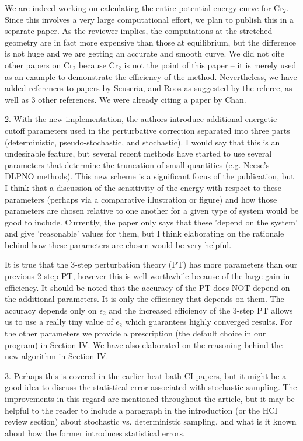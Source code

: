 \documentclass[
preprint,
onecolumn,
 superscriptaddress,
 amsmath,amssymb,
 aps,
]{revtex4-1}
\begin{document}
We are indeed working on calculating the entire potential energy curve for Cr$_2$.  Since this
involves a very large computational effort,
we plan to publish this in a separate paper.  As the reviewer implies, the computations at the
stretched geometry are in fact
more expensive than those at equilibrium, but the difference is not huge and we are getting an
accurate and smooth curve.
We did not cite other papers on Cr$_2$ because Cr$_2$ is not the point of this paper -- it is
merely used as an example to demonstrate
the efficiency of the method.  Nevertheless, we have added references to papers by Scuseria,
and Roos as suggested by the referee, as well as 3 other references.  We were already citing a
paper by Chan.

\vskip 5mm {\color{blue}
2. With the new implementation, the authors introduce additional energetic cutoff parameters
used in the perturbative correction separated into three parts (deterministic, pseudo-stochastic,
and stochastic). I would say that this is an undesirable feature, but several recent methods have
started to use several parameters that determine the truncation of small quantities (e.g. Neese's
DLPNO methods). This new scheme is a significant focus of the publication, but I think that
a discussion of the sensitivity of the energy with respect to these parameters (perhaps via a
comparative illustration or figure) and how those parameters are chosen relative to one another
for a given type of system would be good to include. Currently, the paper only says that these
'depend on the system' and give 'reasonable' values for them, but I think elaborating on the
rationale behind how these parameters are chosen would be very helpful.
}\color{black}

It is true that the 3-step perturbation theory (PT) has more parameters than our previous 2-step
PT, however this is well worthwhile
because of the large gain in efficiency.  It should be noted that the accuracy of the PT does
NOT depend on the additional parameters.
It is only the efficiency that depends on them.  The accuracy depends only on $\epsilon_2$
and the increased efficiency of the 3-step PT
allows us to use a really tiny value of $\epsilon_2$ which guarantees highly converged results.
For the other parameters we provide a prescription (the default choice in our program) in
Section IV.  We have also elaborated on the reasoning behind the new algorithm in Section IV.

\vskip 5mm {\color{blue}
3. Perhaps this is covered in the earlier heat bath CI papers, but it might be a good idea to
discuss the statistical error associated with stochastic sampling. The improvements in this
regard are mentioned throughout the article, but it may be helpful to the reader to include a
paragraph in the introduction (or the HCI review section) about stochastic vs. deterministic
sampling, and what is it known about how the former introduces statistical errors.
}\color{black}
\end{document}
